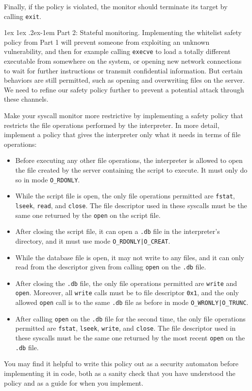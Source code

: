 \documentclass[11pt]{article}
\makeatletter
\renewcommand{\paragraph}{%
  \@startsection{paragraph}{4}%
  {\z@}{1ex \@plus 1ex \@minus .2ex}{-1em}%
  {\normalfont\normalsize\bfseries}
}
\makeatother
\begin{document}
Finally, if the policy is violated, the monitor should terminate its target by calling \verb'exit'.

\paragraph{Part 2: Stateful monitoring.} Implementing the whitelist safety policy from Part 1 will prevent someone from exploiting an unknown vulnerability, and then for example calling \verb'execve' to load a totally different executable from somewhere on the system, or opening new network connections to wait for further instructions or transmit confidential information. But certain behaviors are still permitted, such as opening and overwriting files on the server. We need to refine our safety policy further to prevent a potential attack through these channels.

Make your syscall monitor more restrictive by implementing a safety policy that restricts the file operations performed by the interpreter. In more detail, implement a policy that gives the interpreter only what it needs in terms of file operations:
\begin{itemize}
\item Before executing any other file operations, the interpreter is allowed to open the file created by the server containing the script to execute. It must only do so in mode \verb'O_RDONLY'.
\item While the script file is open, the only file operations permitted are \verb'fstat', \verb'lseek', \verb'read', and \verb'close'. The file descriptor used in these syscalls must be the same one returned by the \verb'open' on the script file.
\item After closing the script file, it can open a \verb'.db' file in the interpreter's directory, and it must use mode \verb'O_RDONLY|O_CREAT'.
\item While the database file is open, it may not write to any files, and it can only read from the descriptor given from calling \verb'open' on the \verb'.db' file.
\item After closing the \verb'.db' file, the only file operations permitted are \verb'write' and \verb'open'. Moreover, all \verb'write' calls must be to file descriptor \verb'0x1', and the only allowed \verb'open' call is to the same \verb'.db' file as before in mode \verb'O_WRONLY|O_TRUNC'.
\item After calling \verb'open' on the \verb'.db' file for the second time, the only file operations permitted are \verb'fstat', \verb'lseek', \verb'write', and \verb'close'. The file descriptor used in these syscalls must be the same one returned by the most recent \verb'open' on the \verb'.db' file.
\end{itemize}
You may find it helpful to write this policy out as a security automaton before implementing it in code, both as a sanity check that you have understood the policy and as a guide for when you implement.
\end{document}
